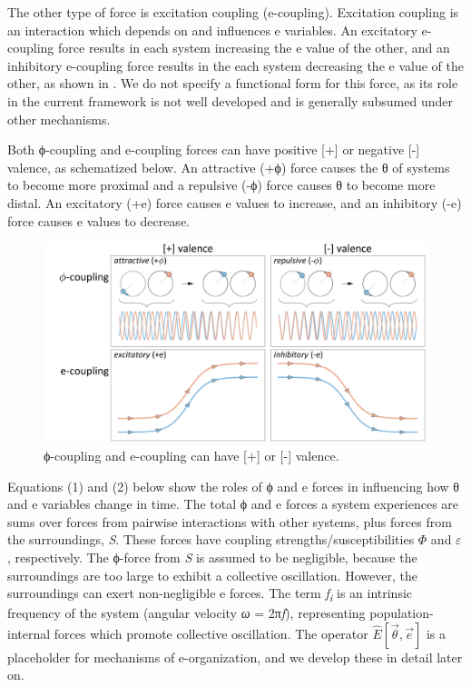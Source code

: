   The other type of force is excitation coupling (e-coupling). Excitation coupling is an interaction which depends on and influences e variables. An excitatory e-coupling force results in each system increasing the e value of the other, and an inhibitory e-coupling force results in the each system decreasing the e value of the other, as shown in {}. We do not specify a functional form for this force, as its role in the current framework is not well developed and is generally subsumed under other mechanisms.

  Both ϕ-coupling and e-coupling forces can have positive [+] or negative [-] valence, as schematized below. An attractive (+ϕ) force causes the θ of systems to become more proximal and a repulsive (-ϕ) force causes θ to become more distal. An excitatory (+e) force causes e values to increase, and an inhibitory (-e) force causes e values to decrease. 

  
\begin{figure}
\includegraphics[width=\textwidth]{figures/Tilsen-img20.png}
\caption{ϕ-coupling and e-coupling can have [+] or [-] valence.}
\label{fig:2:13}
\end{figure}
 

  Equations (1) and (2) below show the roles of ϕ and e forces in influencing how θ and e variables change in time. The total ϕ and e forces a system experiences are sums over forces from pairwise interactions with other systems, plus forces from the surroundings, \textit{S}. These forces have coupling strengths/susceptibilities $\Phi$ and $\varepsilon $, respectively. The ϕ-force from \textit{S} is assumed to be negligible, because the surroundings are too large to exhibit a collective oscillation. However, the surroundings can exert non-negligible e forces. The term \textit{f\textsubscript{i}} is an intrinsic frequency of the system (angular velocity \textit{ω} = 2π\textit{f}), representing population-internal forces which promote collective oscillation. The operator  $\widehat {{E}}\left[\overrightarrow{{\theta}} ,\overrightarrow{{e}}\right]$ is a placeholder for mechanisms of e-organization, and we develop these in detail later on.

